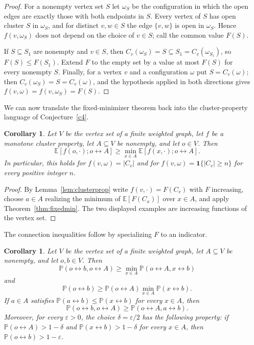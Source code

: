 \documentclass[11pt]{article}
\newtheorem{corollary}[theorem]{Corollary}
\theoremstyle{definition}
\theoremstyle{remark}
\newcommand{\PP}{\mathbb P}
\newcommand{\EE}{\mathbb E}
\newcommand{\one}{\mathbf 1}
\newcommand{\con}{\leftrightarrow}
\begin{document}
\begin{proof}
For a nonempty vertex set $S$ let $\omega_S$ be the configuration in which the open edges
are exactly those with both endpoints in $S$. Every vertex of $S$ has open cluster $S$ in
$\omega_S$, and for distinct $v,w\in S$ the edge $\{v,w\}$ is open in $\omega_S$. Hence
$f(v,\omega_S)$ does not depend on the choice of $v\in S$; call the common value $F(S)$.

If $S\subseteq S_1$ are nonempty and $v\in S$, then $C_v(\omega_S)=S\subseteq
S_1=C_v(\omega_{S_1})$, so $F(S)\le F(S_1)$. Extend $F$ to the empty set by a value at most
$F(S)$ for every nonempty $S$. Finally, for a vertex $v$ and a configuration $\omega$ put
$S=C_v(\omega)$; then $C_v(\omega_S)=S=C_v(\omega)$, and the hypothesis applied in both
directions gives $f(v,\omega)=f(v,\omega_S)=F(S)$.
\end{proof}

We can now translate the fixed-minimizer theorem back into the cluster-property language
of Conjecture~\ref{c4}.

\begin{corollary}\label{cor:c4}
Let $V$ be the vertex set of a finite weighted graph, let $f$ be a monotone cluster
property, let $A\subseteq V$ be nonempty, and let $o\in V$. Then
\[
 \EE[f(o,\cdot);o\con A]\geq
 \min_{x\in A}\EE[f(x,\cdot);o\con A].
\]
In particular, this holds for $f(v,\omega)=|C_v|$ and for
$f(v,\omega)=\one\{|C_v|\geq n\}$ for every positive integer $n$.
\end{corollary}

\begin{proof}
By Lemma~\ref{lem:clusterprop} write $f(v,\cdot)=F(C_v)$ with $F$ increasing, choose $a\in
A$ realizing the minimum of $\EE[F(C_x)]$ over $x\in A$, and apply
Theorem~\ref{thm:fixedmin}. The two displayed examples are increasing functions of the
vertex set.
\end{proof}

The connection inequalities follow by specializing $F$ to an indicator.

\begin{corollary}\label{cor:c123}
Let $V$ be the vertex set of a finite weighted graph, let $A\subseteq V$ be nonempty, and
let $o,b\in V$. Then
\[
 \PP(o\con b,o\con A)\geq\min_{x\in A}\PP(o\con A,x\con b)
\]
and
\[
 \PP(o\con b)\geq\PP(o\con A)\min_{x\in A}\PP(x\con b).
\]
If $a\in A$ satisfies $\PP(a\con b)\leq\PP(x\con b)$ for every $x\in A$, then
\[
 \PP(o\con b,o\con A)\geq\PP(o\con A,a\con b).
\]
Moreover, for every $\varepsilon>0$, the choice $\delta=\varepsilon/2$ has the following
property: if $\PP(o\con A)>1-\delta$ and $\PP(x\con b)>1-\delta$ for every $x\in A$, then
$\PP(o\con b)>1-\varepsilon$.
\end{corollary}
\end{document}
